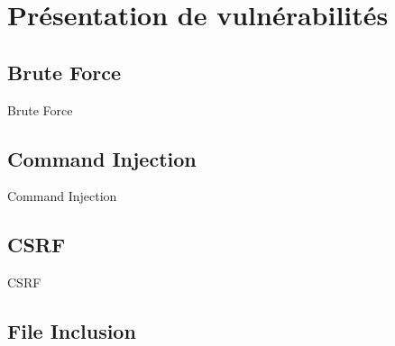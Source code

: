 \documentclass[8pt]{beamer}
\begin{document}
\section{Présentation de vulnérabilités}

\begin{frame}
  \tableofcontents[sectionstyle=show/shaded,subsectionstyle=show]
\end{frame}

\subsection{Brute Force}

\begin{frame}{Brute Force}

\end{frame}

\subsection{Command Injection}

\begin{frame}{Command Injection}

\end{frame}

\subsection{CSRF}

\begin{frame}{CSRF}

\end{frame}

\subsection{File Inclusion}
\end{document}
